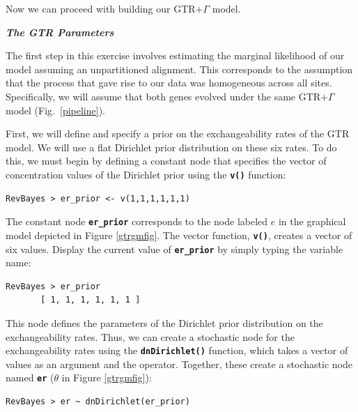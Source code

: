 \documentclass[11pt]{article}
\newcommand{\cl}[1]{{\texttt{\textbf{#1}}}}
\newcommand{\rbdn}{{\Large \symbol{126}}} %
\begin{document}
Now we can proceed with building our GTR$+\Gamma$ model.

\textbf{\textit{The GTR Parameters}}

The first step in this exercise involves estimating the marginal likelihood of our model assuming an unpartitioned alignment. 
This corresponds to the assumption that the process that gave rise to our data was homogeneous across all sites. 
Specifically, we will assume that both genes evolved under the same GTR$+\Gamma$ model (Fig.~\ref{pipeline}). 


First, we will define and specify a prior on the exchangeability rates of the GTR model. We will use a flat Dirichlet prior distribution on these six rates. To do this, we must begin by defining a constant node that specifies the vector of concentration values of the Dirichlet prior using the \cl{v()} function:
{\tt \begin{snugshade*}
\begin{lstlisting}
RevBayes > er_prior <- v(1,1,1,1,1,1) 
\end{lstlisting}
\end{snugshade*}}


The constant node \cl{er\_prior} corresponds to the node labeled $e$ in the graphical model depicted in Figure \ref{gtrgmfig}. 
The vector function, \cl{v()}, creates a vector of six values. 
Display the current value of \cl{er\_prior} by simply typing the variable name:
{\tt \begin{snugshade*}
\begin{lstlisting}
RevBayes > er_prior
       [ 1, 1, 1, 1, 1, 1 ]
\end{lstlisting}
\end{snugshade*}}
This node defines the parameters of the Dirichlet prior distribution on the exchangeability rates. Thus, we can create a stochastic node for the exchangeability rates using the \cl{dnDirichlet()} function, which takes a vector of values as an argument and the \cl{\rbdn} operator. Together, these create a stochastic node named \cl{er} ($\theta$ in Figure \ref{gtrgmfig}): 
{\tt \begin{snugshade*}
\begin{lstlisting}
RevBayes > er ~ dnDirichlet(er_prior)
\end{lstlisting}
\end{snugshade*}}
\end{document}
